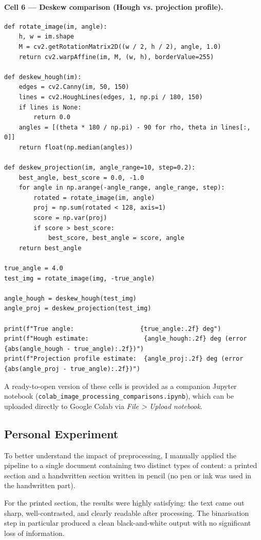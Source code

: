 \documentclass[12pt, a4paper]{article}
\begin{document}
\paragraph{Cell 6 --- Deskew comparison (Hough vs. projection profile).}
\begin{lstlisting}
def rotate_image(im, angle):
    h, w = im.shape
    M = cv2.getRotationMatrix2D((w / 2, h / 2), angle, 1.0)
    return cv2.warpAffine(im, M, (w, h), borderValue=255)

def deskew_hough(im):
    edges = cv2.Canny(im, 50, 150)
    lines = cv2.HoughLines(edges, 1, np.pi / 180, 150)
    if lines is None:
        return 0.0
    angles = [(theta * 180 / np.pi) - 90 for rho, theta in lines[:, 0]]
    return float(np.median(angles))

def deskew_projection(im, angle_range=10, step=0.2):
    best_angle, best_score = 0.0, -1.0
    for angle in np.arange(-angle_range, angle_range, step):
        rotated = rotate_image(im, angle)
        proj = np.sum(rotated < 128, axis=1)
        score = np.var(proj)
        if score > best_score:
            best_score, best_angle = score, angle
    return best_angle

true_angle = 4.0
test_img = rotate_image(img, -true_angle)

angle_hough = deskew_hough(test_img)
angle_proj = deskew_projection(test_img)

print(f"True angle:                  {true_angle:.2f} deg")
print(f"Hough estimate:               {angle_hough:.2f} deg (error {abs(angle_hough - true_angle):.2f})")
print(f"Projection profile estimate:  {angle_proj:.2f} deg (error {abs(angle_proj - true_angle):.2f})")
\end{lstlisting}

A ready-to-open version of these cells is provided as a companion Jupyter notebook (\texttt{colab\_image\_processing\_comparisons.ipynb}), which can be uploaded directly to Google Colab via \textit{File > Upload notebook}.

\subsection{Personal Experiment}

To better understand the impact of preprocessing, I manually applied the pipeline to a single document containing two distinct types of content: a printed section and a handwritten section written in pencil (no pen or ink was used in the handwritten part).

For the printed section, the results were highly satisfying: the text came out sharp, well-contrasted, and clearly readable after processing. The binarisation step in particular produced a clean black-and-white output with no significant loss of information.
\end{document}
